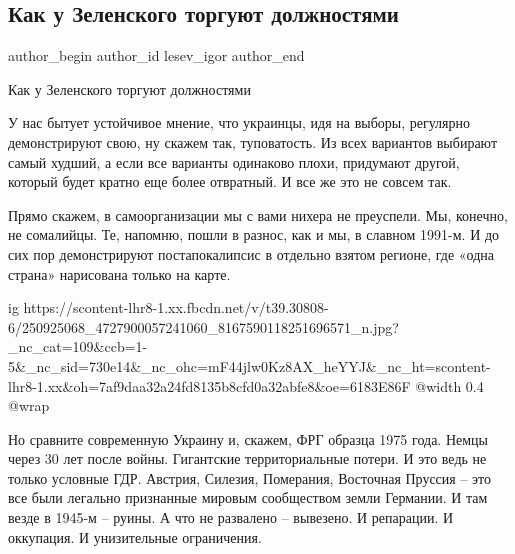 
 
 
 
 
 
\subsection{Как у Зеленского торгуют должностями}
\label{sec:29_10_2021.fb.lesev_igor.1.zelenskii_dolzhnosti_torgovlja}
 
\ifcmt
 author_begin
   author_id lesev_igor
 author_end
\fi

Как у Зеленского торгуют должностями

У нас бытует устойчивое мнение, что украинцы, идя на выборы, регулярно
демонстрируют свою, ну скажем так, туповатость. Из всех вариантов выбирают
самый худший, а если все варианты одинаково плохи, придумают другой, который
будет кратно еще более отвратный. И все же это не совсем так.

Прямо скажем, в самоорганизации мы с вами нихера не преуспели. Мы, конечно, не
сомалийцы. Те, напомню, пошли в разнос, как и мы, в славном 1991-м. И до сих
пор демонстрируют постапокалипсис в отдельно взятом регионе, где «одна страна»
нарисована только на карте.

\ifcmt
  ig https://scontent-lhr8-1.xx.fbcdn.net/v/t39.30808-6/250925068_4727900057241060_8167590118251696571_n.jpg?_nc_cat=109&ccb=1-5&_nc_sid=730e14&_nc_ohc=mF44jlw0Kz8AX_heYYJ&_nc_ht=scontent-lhr8-1.xx&oh=7af9daa32a24fd8135b8cfd0a32abfe8&oe=6183E86F
  @width 0.4
  @wrap 
\fi

Но сравните современную Украину и, скажем, ФРГ образца 1975 года. Немцы через
30 лет после войны. Гигантские территориальные потери. И это ведь не только
условные ГДР. Австрия, Силезия, Померания, Восточная Пруссия – это все были
легально признанные мировым сообществом земли Германии. И там везде в 1945-м –
руины. А что не развалено – вывезено. И репарации. И оккупация. И унизительные
ограничения.

